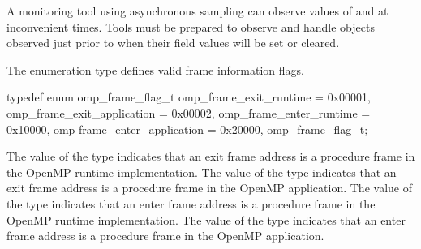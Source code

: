 \begin{note}
A monitoring tool using asynchronous sampling can observe values
of  and  at inconvenient times.
Tools must be prepared to observe and handle 
objects observed just prior to when their field values will be set or
cleared.
\end{note}


\summary
The  enumeration type defines valid frame information
flags.

\syntax
\begin{ccppspecific}
\begin{ompSyntax}
typedef enum omp_frame_flag_t {
  omp_frame_exit_runtime        = 0x00001,
  omp_frame_exit_application    = 0x00002,
  omp_frame_enter_runtime       = 0x10000,
  omp frame_enter_application   = 0x20000,
} omp_frame_flag_t; 
\end{ompSyntax}
\end{ccppspecific}

\descr
The value  of the  type
indicates that an exit frame address is a procedure frame in the OpenMP
runtime implementation.
The value  of the  type
indicates that an exit frame address is a procedure frame in the OpenMP
application.
The value  of the  type
indicates that an enter frame address is a procedure frame in the OpenMP
runtime implementation.
The value  of the  type
indicates that an enter frame address is a procedure frame in the OpenMP
application.
